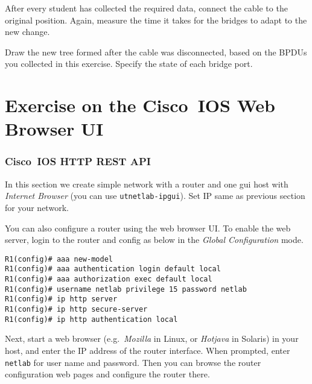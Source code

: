 \documentclass{../UTNetLab}
\begin{document}
    After every student has collected the required data, connect the cable to the original position. Again, measure the time it takes for the bridges to adapt to the new change.
    
    \begin{report}
    \item Draw the new tree formed after the cable was disconnected, based on the BPDUs you collected in this exercise. Specify the state of each bridge port.
    \end{report}

\part{Exercise on the Cisco~IOS Web Browser UI}
\section{Cisco~IOS HTTP REST API}
    In this section we create simple network with a router and one gui host with \textit{Internet Browser} (you can use \texttt{utnetlab-ipgui}). Set IP same as previous section for your network.

    You can also configure a router using the web browser UI. To enable the web server, login to the router and config as below  in the \textit{Global Configuration} mode. 

    \begin{lstlisting}[language={cisco},emph={netlab}]
R1(config)# aaa new-model
R1(config)# aaa authentication login default local
R1(config)# aaa authorization exec default local
R1(config)# username netlab privilege 15 password netlab
R1(config)# ip http server
R1(config)# ip http secure-server
R1(config)# ip http authentication local
    \end{lstlisting}
    
    Next, start a web browser (e.g.\ \textit{Mozilla} in Linux, or \textit{Hotjava} in Solaris) in your host, and enter the IP address of the router interface. When prompted, enter \texttt{netlab} for user name and password. Then you can browse the router configuration web pages and configure the router there.
\end{document}

